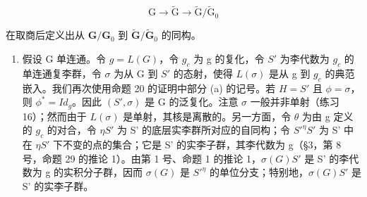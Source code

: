 \[
\mathrm{G} \rightarrow \tilde {\mathrm{G}} \rightarrow \tilde {\mathrm{G}} / \tilde {\mathrm{G}} _ {0}
\]

在取商后定义出从 \(\mathbf{G} / \mathbf{G}_0\) 到 \(\tilde{\mathbf{G}} / \tilde{\mathbf{G}}_0\) 的同构。

\begin{enumerate}
\def\labelenumi{(\arabic{enumi})}
\setcounter{enumi}{1}
\tightlist
\item
  假设 G 单连通。令 \(g = L(G)\)，令 \(g_{c}\) 为 g 的复化，令 \(S'\) 为李代数为 \(g_{c}\) 的单连通复李群，令 \(\sigma\) 为从 G 到 \(S'\) 的态射，使得 \(L(\sigma)\) 是从 g 到 \(g_{c}\) 的典范嵌入。我们再次使用命题 20 的证明中部分 (a) 的记号。若 \(H = S'\) 且 \(\phi = \sigma\)，则 \(\phi^{*} = I d_{g}\)。因此 \((S', \sigma)\) 是 G 的泛复化。注意 \(\sigma\) 一般并非单射（练习 16）；然而由于 \(L(\sigma)\) 是单射，其核是离散的。另一方面，令 \(\theta\) 为由 g 定义的 \(g_{c}\) 的对合，令 \(\eta\)\(S'\) 为 S' 的底层实李群所对应的自同构；令 \(S'^{\eta}\)\(S'\) 为 S' 中在 \(\eta\)\(S'\) 下不变的点的集合；它是 S' 的实李子群，其李代数为 g（§3，第 8 号，命题 29 的推论 1）。由第 1 号、命题 1 的推论 1，\(\sigma(G)\)\(S'\) 是 S' 的李代数为 g 的实积分子群，因而 \(\sigma(G)\) 是 \(S'^{\eta}\) 的单位分支；特别地，\(\sigma(G)\)\(S'\) 是 S' 的实李子群。
\end{enumerate}

